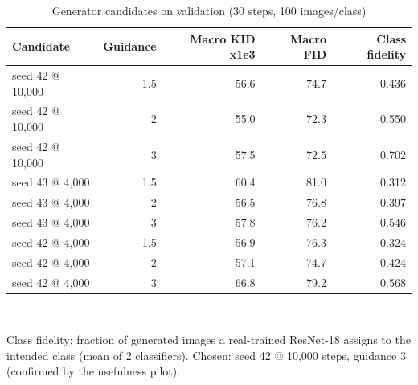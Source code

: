 \begin{table}[t]
\centering
\footnotesize
\caption{Generator candidates on validation (30 steps, 100 images/class)}
\label{tab:t03_generator_selection}
\begin{tabular}{lrrrr}
\toprule
Candidate & Guidance & Macro KID x1e3 & Macro FID & Class fidelity \\
\midrule
seed 42 @ 10,000 & 1.5 & 56.6 & 74.7 & 0.436 \\
seed 42 @ 10,000 & 2 & 55.0 & 72.3 & 0.550 \\
seed 42 @ 10,000 & 3 & 57.5 & 72.5 & 0.702 \\
seed 43 @ 4,000 & 1.5 & 60.4 & 81.0 & 0.312 \\
seed 43 @ 4,000 & 2 & 56.5 & 76.8 & 0.397 \\
seed 43 @ 4,000 & 3 & 57.8 & 76.2 & 0.546 \\
seed 42 @ 4,000 & 1.5 & 56.9 & 76.3 & 0.324 \\
seed 42 @ 4,000 & 2 & 57.1 & 74.7 & 0.424 \\
seed 42 @ 4,000 & 3 & 66.8 & 79.2 & 0.568 \\
\bottomrule
\end{tabular}
\\[2pt]\parbox{\linewidth}{\scriptsize Class fidelity: fraction of generated images a real-trained ResNet-18 assigns to the intended class (mean of 2 classifiers). Chosen: seed 42 @ 10,000 steps, guidance 3 (confirmed by the usefulness pilot).}
\end{table}
